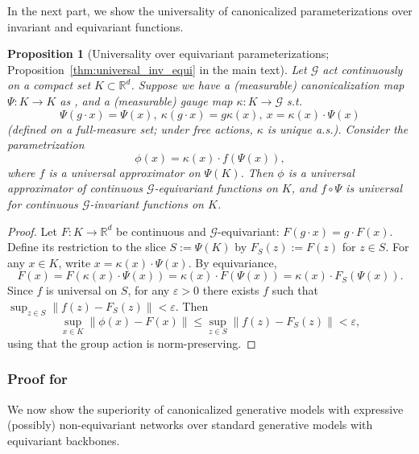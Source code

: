 \documentclass{article}
\theoremstyle{plain}
\newtheorem{proposition}[theorem]{Proposition}
\theoremstyle{definition}
\theoremstyle{remark}
\newcommand{\R}{\mathbb{R}}
\newcommand{\1}{\mathbf{1}}
\newcommand{\G}{\mathcal{G}}
\newcommand{\norm}[1]{\left\lVert #1\right\rVert}
\newcommand{\acts}{\cdot} %
\begin{document}
In the next part, we show the universality of canonicalized parameterizations over invariant and equivariant functions.

\begin{proposition}[Universality over equivariant parameterizations; Proposition~\ref{thm:universal_inv_equi} in the main text]
Let $\G$ act continuously on a compact set $K\subset \R^d$. Suppose we have a (measurable) canonicalization map $\Psi:K\to K$ as , and a (measurable) gauge map $\kappa:K\to \G$ s.t.
\begin{equation}%
\Psi(g\acts x)=\Psi(x),\ \kappa(g\acts x)=g\kappa(x),\ x=\kappa(x)\acts \Psi(x)
\end{equation}
(defined on a full-measure set; under free actions, $\kappa$ is unique a.s.). Consider the parametrization
\begin{equation}
\phi(x)=\kappa(x)\acts f(\Psi(x)),
\end{equation}
where $f$ is a universal approximator on $\Psi(K)$. Then $\phi$ is a universal approximator of continuous $\G$-equivariant functions on $K$, and $f\circ \Psi$ is universal for continuous $\G$-invariant functions on $K$.
\end{proposition}

\begin{proof}
Let $F:K\to \R^d$ be continuous and $\G$-equivariant: $F(g\acts x)=g\acts F(x)$. Define its restriction to the slice $S:=\Psi(K)$ by $F_S(z):=F(z)$ for $z\in S$.
For any $x\in K$, write $x=\kappa(x)\acts \Psi(x)$. By equivariance,
\begin{equation}
F(x)=F(\kappa(x)\acts \Psi(x))=\kappa(x)\acts F(\Psi(x))=\kappa(x)\acts F_S(\Psi(x)).
\end{equation}
Since $f$ is universal on $S$, for any $\varepsilon>0$ there exists $f$ such that $\sup_{z\in S}\norm{f(z)-F_S(z)}<\varepsilon$. Then
\begin{equation}
\sup_{x\in K}\norm{\phi(x)-F(x)}\le \sup_{z\in S}\norm{f(z)-F_S(z)}<\varepsilon,
\end{equation}
using that the group action is norm-preserving.
\end{proof}


\subsubsection{Proof for }\label{subsubsec_appendix:proof_superior}
We now show the superiority of canonicalized generative models with expressive (possibly) non-equivariant networks over standard generative models with equivariant backbones. 
\end{document}
